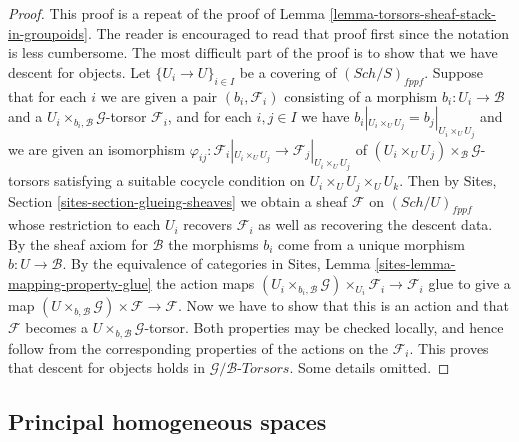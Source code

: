 \documentclass{stacks-project}
\theoremstyle{plain}
\theoremstyle{definition}
\theoremstyle{remark}
\numberwithin{equation}{subsection}
\def\Sch{\mathit{Sch}}
\begin{document}
\begin{proof}
This proof is a repeat of the proof of
Lemma \ref{lemma-torsors-sheaf-stack-in-groupoids}.
The reader is encouraged to read that proof first since
the notation is less cumbersome.
The most difficult part of the proof is to show that
we have descent for objects. Let $\{U_i \to U\}_{i \in I}$
be a covering of $(\Sch/S)_{fppf}$.
Suppose that for each $i$ we are given a pair $(b_i, \mathcal{F}_i)$
consisting of a morphism $b_i : U_i \to \mathcal{B}$ and a
$U_i \times_{b_i, \mathcal{B}} \mathcal{G}$-torsor
$\mathcal{F}_i$, and for each $i, j \in I$
we have $b_i|_{U_i \times_U U_j} = b_j|_{U_i \times_U U_j}$ and
we are given an isomorphism
$\varphi_{ij} :
\mathcal{F}_i|_{U_i \times_U U_j} \to \mathcal{F}_j|_{U_i \times_U U_j}$
of $(U_i \times_U U_j) \times_\mathcal{B} \mathcal{G}$-torsors
satisfying a suitable cocycle condition on $U_i \times_U U_j \times_U U_k$.
Then by
Sites, Section \ref{sites-section-glueing-sheaves}
we obtain a sheaf $\mathcal{F}$ on $(\Sch/U)_{fppf}$
whose restriction to each $U_i$ recovers $\mathcal{F}_i$ as well
as recovering the descent data. By the sheaf axiom for $\mathcal{B}$
the morphisms $b_i$ come from a unique morphism $b : U \to \mathcal{B}$.
By the equivalence of categories in
Sites, Lemma \ref{sites-lemma-mapping-property-glue}
the action maps
$(U_i \times_{b_i, \mathcal{B}} \mathcal{G}) \times_{U_i} \mathcal{F}_i
\to \mathcal{F}_i$
glue to give a map
$(U \times_{b, \mathcal{B}} \mathcal{G}) \times \mathcal{F} \to \mathcal{F}$.
Now we have to show that this is an action and that $\mathcal{F}$ becomes
a $U \times_{b, \mathcal{B}} \mathcal{G}$-torsor.
Both properties may be checked locally, and
hence follow from the corresponding properties of the actions
on the $\mathcal{F}_i$.
This proves that descent for objects holds in
$\mathcal{G}/\mathcal{B}\textit{-Torsors}$.
Some details omitted.
\end{proof}



\subsection{Principal homogeneous spaces}
\label{subsection-principal-homogeneous-spaces}
\end{document}
